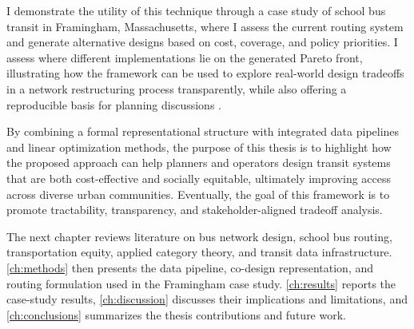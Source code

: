 I demonstrate the utility of this technique through a case study of school bus transit in Framingham, Massachusetts, where I assess the current routing system and generate alternative designs based on cost, coverage, and policy priorities. I assess where different implementations lie on the generated Pareto front, illustrating how the framework can be used to explore real-world design tradeoffs in a network restructuring process transparently, while also offering a reproducible basis for planning discussions \cite{bertsimasBusRoutingOptimization2020}.

By combining a formal representational structure with integrated data pipelines and linear optimization methods, the purpose of this thesis is to highlight how the proposed approach can help planners and operators design transit systems that are both cost-effective and socially equitable, ultimately improving access across diverse urban communities. Eventually, the goal of this framework is to promote tractability, transparency, and stakeholder-aligned tradeoff analysis.

The next chapter reviews literature on bus network design, school bus routing, transportation equity, applied category theory, and transit data infrastructure. \autoref{ch:methods} then presents the data pipeline, co-design representation, and routing formulation used in the Framingham case study. \autoref{ch:results} reports the case-study results, \autoref{ch:discussion} discusses their implications and limitations, and \autoref{ch:conclusions} summarizes the thesis contributions and future work.